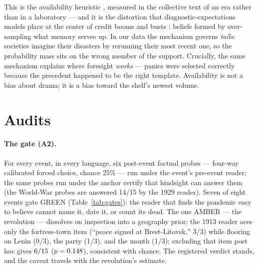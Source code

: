\documentclass[11pt]{article}
\begin{document}
This is the availability heuristic \citep{tversky1973}, measured in the collective text of an era rather
than in a laboratory --- and it is the distortion that diagnostic-expectations models place at the center of
credit booms and busts \citep{bordalo2018,gennaioli2018}: beliefs formed by over-sampling what memory serves
up. In our data the mechanism governs \emph{tails}: societies imagine their disasters by rerunning their most
recent one, so the probability mass sits on the wrong member of the support. Crucially, the same mechanism
explains where foresight \emph{works} --- panics were selected correctly because the precedent happened to be
the right template. Availability is not a bias about drama; it is a bias toward the shelf's newest volume.

\section{Audits}\label{sec:validity}

\paragraph{The gate (A2).} For every event, in every language, six post-event factual probes --- four-way
calibrated forced choice, chance 25\% --- run under the event's pre-event reader; the same probes run under
the anchor certify that hindsight can answer them (the World-War probes are answered 14/15 by the 1929
reader). Seven of eight events gate GREEN (Table~\ref{tab:gates}): the reader that finds the pandemic easy
to believe cannot name it, date it, or count its dead. The one AMBER --- the revolution --- dissolves on
inspection into a geography prior: the 1913 reader aces only the fortress-town item (``peace signed at
Brest-Litovsk,'' 3/3) while flooring on Lenin (0/3), the party (1/3), and the month (1/3); excluding that
item post hoc gives $6/15$ ($p=0.148$), consistent with chance. The registered
verdict stands, and the caveat travels with the revolution's estimate.

\begin{table}[t]\centering\small

\caption{\textbf{The contamination gate.} GREEN = pre-event accuracy consistent with chance (binomial test):
the low strain of Section~\ref{sec:thinkable} is foresight, not leakage. The ceiling column validates the
probes under the hindsight anchor. Items with pre-registered period-prior caveats are excluded from verdicts.
$^{\dagger}$Post-hoc sensitivity discussed in the text.}
\label{tab:gates}
\end{table}
\end{document}
